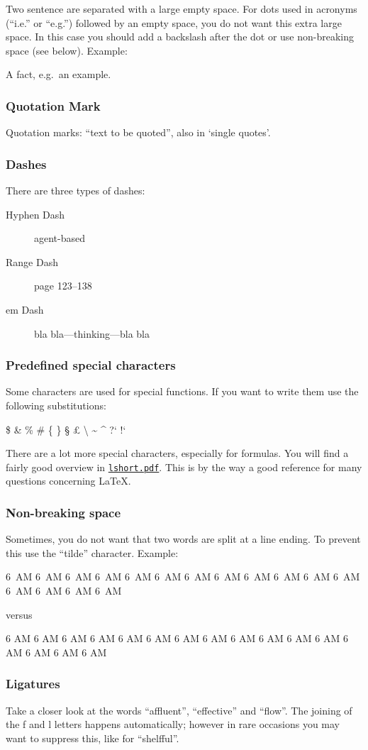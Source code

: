 Two sentence are separated with a large empty space. For dots used in
acronyms (``i.e.'' or ``e.g.'') followed by an empty space, you do not
want this extra large space. In this case you should add a backslash
after the dot
or use non-breaking space (see below).
Example:

A fact, e.g.\ an example.

\subsubsection{Quotation Mark}

Quotation marks: ``text to be quoted'', also in `single quotes'.

\subsubsection{Dashes}

There are three types of dashes:
\begin{description}
  \item[Hyphen Dash] agent-based
  \item[Range Dash] page 123--138
  \item[em Dash] bla bla---thinking---bla bla
\end{description}

\subsubsection{Predefined special characters}

Some characters are used for special functions. If you want to write
them use the following substitutions:

\$
\&
\%
\#
\{
\}
%
\S{}
\pounds{}
\textbackslash{}
\textasciitilde{}
\textasciicircum{}
%
?`
!`

There are a lot more special characters, especially for formulas.
You will find a fairly good overview in
\href{http://www.ctan.org/tex-archive/info/lshort/english/lshort.pdf}{\texttt{lshort.pdf}}.
This is by the way a good reference for many questions concerning \LaTeX{}.

\subsubsection{Non-breaking space}

Sometimes, you do not want that two words are split at a line ending.
To prevent this use the ``tilde'' character. Example:

6~AM 6~AM 6~AM 6~AM 6~AM 6~AM 6~AM 6~AM 6~AM 6~AM 6~AM 6~AM 6~AM 6~AM
6~AM 6~AM

versus

6 AM 6 AM 6 AM 6 AM 6 AM 6 AM 6 AM 6 AM 6 AM 6 AM 6 AM 6 AM 6 AM 6 AM
6 AM 6 AM

\subsubsection{Ligatures}

Take a closer look at the words ``affluent'', ``effective'' and ``flow''.
The joining of the f and l letters
happens automatically; however in rare occasions 
you may want to
suppress this, like for ``shelf{}ful''.
